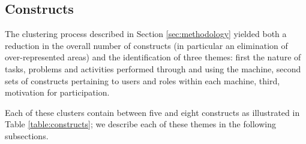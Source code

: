 \documentclass{www13-companion-accepted}
\begin{document}

\vfill\eject
\subsection{Constructs}
The clustering process described in Section \ref{sec:methodology} yielded both a
reduction in the overall number of constructs (in particular an
elimination of over-represented areas) and the identification of three
themes: first the nature of tasks, problems and activities
performed through and using the machine, second sets of constructs pertaining to users and roles within
each machine, third, motivation for participation.

Each of these clusters contain between five and eight constructs as illustrated in Table
\ref{table:constructs}; we describe each of these themes in the
following subsections.
\end{document}
